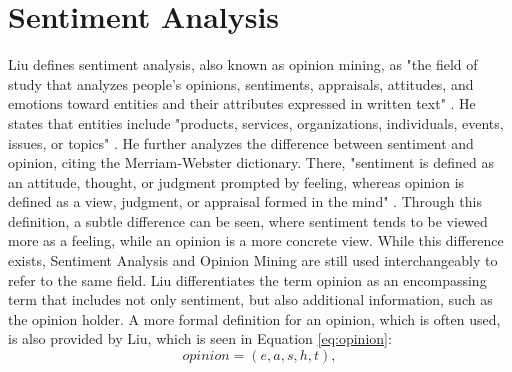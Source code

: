 \section{Sentiment Analysis}
Liu defines sentiment analysis, also known as opinion mining, as "the field of study that analyzes people's opinions, sentiments, appraisals, attitudes, and emotions toward entities and their attributes expressed in written text" \cite[p.~1]{liu_2015}. He states that entities include "products, services, organizations, individuals, events, issues, or topics" \cite[p.~1]{liu_2015}. He further analyzes the difference between sentiment and opinion, citing the Merriam-Webster dictionary. There, "sentiment is defined as an attitude, thought, or judgment prompted by feeling, whereas opinion is defined as a view, judgment, or appraisal formed in the mind" \cite[p.~2]{liu_2015}. Through this definition, a subtle difference can be seen, where sentiment tends to be viewed more as a feeling, while an opinion is a more concrete view. While this difference exists, Sentiment Analysis and Opinion Mining are still used interchangeably to refer to the same field. Liu differentiates the term opinion as an encompassing term that includes not only sentiment, but also additional information, such as the opinion holder. A more formal definition for an opinion, which is often used, is also provided by Liu, which is seen in Equation \eqref{eq:opinion}:
\begin{equation}
    opinion = (e, a, s, h, t),
    \label{eq:opinion}
\end{equation}
